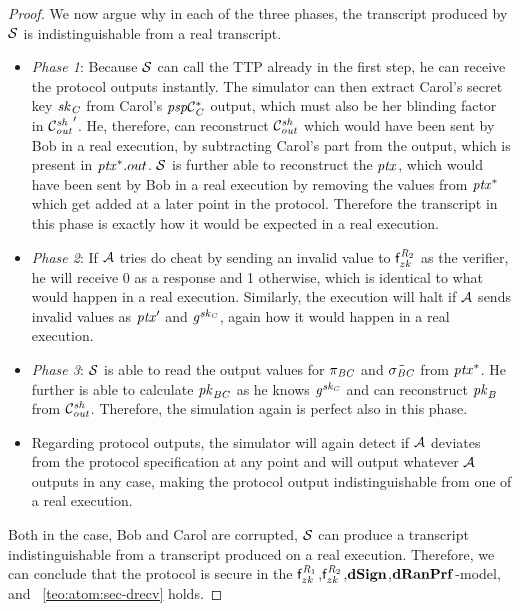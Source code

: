 \begin{proof}
    We now argue why in each of the three phases, the transcript produced by $\mathcal{S}$ is indistinguishable from a real transcript.

    \begin{itemize}
        \item \textit{Phase 1}: Because $\mathcal{S}$ can call the TTP already in the first step, he can receive the protocol outputs instantly.
        The simulator can then extract Carol's secret key $\mathit{sk}_{\mathit{C}}$ from Carol's $\mathit{psp}\mathcal{C}_{\mathit{C}}^*$ output, which must also be her blinding factor in ${\mathcal{C}_{\mathit{out}}^{\mathit{sh}}}'$.
        He, therefore, can reconstruct $\mathcal{C}_{\mathit{out}}^{\mathit{sh}}$ which would have been sent by Bob in a real execution, by subtracting Carol's part from the output, which is present in $\mathit{ptx}^*.out$.
        $\mathcal{S}$ is further able to reconstruct the $\mathit{ptx}$, which would have been sent by Bob in a real execution by removing the values from $\mathit{ptx}^*$ which get added at a later point in the protocol.
        Therefore the transcript in this phase is exactly how it would be expected in a real execution.
        \item \textit{Phase 2}: If $\mathcal{A}$ tries do cheat by sending an invalid value to $\mathsf{f}^{\mathit{R}_2}_{zk}$ as the verifier, he will receive 0 as a response and 1 otherwise, which is identical to what would happen in a real execution.
        Similarly, the execution will halt if $\mathcal{A}$ sends invalid values as ${\mathit{ptx}}'$ and $\mathit{g}^{\mathit{sk}_{\mathit{C}}}$, again how it would happen in a real execution.
        \item \textit{Phase 3}: $\mathcal{S}$ is able to read the output values for $\pi_{\mathit{B}\mathit{C}}$ and $\tilde{\sigma_{\mathit{B}\mathit{C}}}$ from $\mathit{ptx}^*$.
        He further is able to calculate $\mathit{pk}_{\mathit{B}\mathit{C}}$ as he knows $\mathit{g}^{\mathit{sk}_{\mathit{C}}}$ and can reconstruct $\mathit{pk}_{\mathit{B}}$ from $\mathcal{C}_{\mathit{out}}^{\mathit{sh}}$.
        Therefore, the simulation again is perfect also in this phase.
        \item Regarding protocol outputs, the simulator will again detect if $\mathcal{A}$ deviates from the protocol specification at any point and will output whatever $\mathcal{A}$ outputs in any case, making the protocol output indistinguishable from one of a real execution.
    \end{itemize}

    Both in the case, Bob and Carol are corrupted, $\mathcal{S}$ can produce a transcript indistinguishable from a transcript produced on a real execution.
    Therefore, we can conclude that the protocol is secure in the $\mathsf{f}^{\mathit{R}_1}_{zk}$,$\mathsf{f}^{\mathit{R}_2}_{zk}$,$\mathbf{dSign}$,$\mathbf{dRanPrf}$-model, and ~\cref{teo:atom:sec-drecv} holds.
\end{proof}


